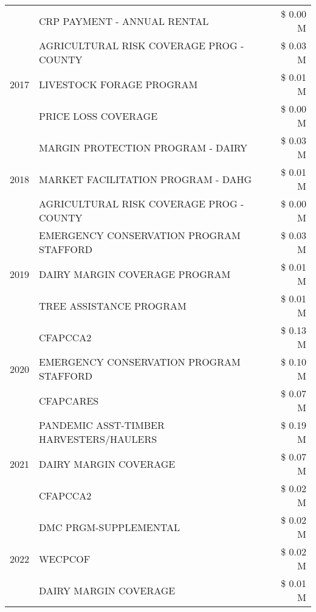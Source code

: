\begin{tabular}{llr}
 & CRP PAYMENT - ANNUAL RENTAL & \$ 0.00 M \\
\cline{1-3}
\multirow[t]{3}{*}{2017} & AGRICULTURAL RISK COVERAGE PROG - COUNTY & \$ 0.03 M \\
 & LIVESTOCK FORAGE PROGRAM & \$ 0.01 M \\
 & PRICE LOSS COVERAGE & \$ 0.00 M \\
\cline{1-3}
\multirow[t]{3}{*}{2018} & MARGIN PROTECTION PROGRAM - DAIRY & \$ 0.03 M \\
 & MARKET FACILITATION PROGRAM - DAHG & \$ 0.01 M \\
 & AGRICULTURAL RISK COVERAGE PROG - COUNTY & \$ 0.00 M \\
\cline{1-3}
\multirow[t]{3}{*}{2019} & EMERGENCY CONSERVATION PROGRAM STAFFORD & \$ 0.03 M \\
 & DAIRY MARGIN COVERAGE PROGRAM & \$ 0.01 M \\
 & TREE ASSISTANCE PROGRAM & \$ 0.01 M \\
\cline{1-3}
\multirow[t]{3}{*}{2020} & CFAPCCA2 & \$ 0.13 M \\
 & EMERGENCY CONSERVATION PROGRAM STAFFORD & \$ 0.10 M \\
 & CFAPCARES & \$ 0.07 M \\
\cline{1-3}
\multirow[t]{3}{*}{2021} & PANDEMIC ASST-TIMBER HARVESTERS/HAULERS & \$ 0.19 M \\
 & DAIRY MARGIN COVERAGE & \$ 0.07 M \\
 & CFAPCCA2 & \$ 0.02 M \\
\cline{1-3}
\multirow[t]{3}{*}{2022} & DMC PRGM-SUPPLEMENTAL & \$ 0.02 M \\
 & WECPCOF & \$ 0.02 M \\
 & DAIRY MARGIN COVERAGE & \$ 0.01 M \\
\cline{1-3}
\bottomrule
\end{tabular}
